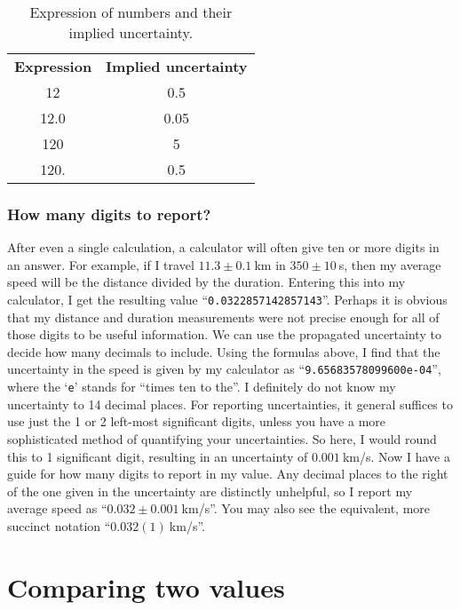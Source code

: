 \begin{table}
	\begin{center}
		\begin{tabular}{cc}
			\textbf{Expression} & \textbf{Implied uncertainty} \\
			12 & 0.5 \\
			12.0 & 0.05 \\
			120 & 5 \\
			120. & 0.5
		\end{tabular}
		\caption{Expression of numbers and their implied uncertainty.}\label{unc:tab:implied}
	\end{center}
\end{table}

\subsubsection{How many digits to report?}

After even a single calculation, a calculator will often give ten or more digits in an answer.
For example, if I travel $11.3 \pm 0.1\:$km in $350 \pm 10\:$s, then my average speed will be the distance divided by the duration. Entering this into my calculator, I get the resulting value ``\texttt{0.0322857142857143}''.
Perhaps it is obvious that my distance and duration measurements were not precise enough for all of those digits to be useful information.
We can use the propagated uncertainty to decide how many decimals to include.
Using the formulas above, I find that the uncertainty in the speed is given by my calculator as ``\texttt{9.65683578099600e-04}'', where the `\texttt{e}' stands for ``times ten to the''.
I definitely do not know my uncertainty to 14 decimal places.
For reporting uncertainties, it general suffices to use just the 1 or 2 left-most significant digits, unless you have a more sophisticated method of quantifying your uncertainties.
So here, I would round this to 1 significant digit, resulting in an uncertainty of $0.001\:$km/s.
Now I have a guide for how many digits to report in my value.
Any decimal places to the right of the one given in the uncertainty are distinctly unhelpful, so I report my average speed as ``$0.032 \pm 0.001\:$km/s''.
You may also see the equivalent, more succinct notation ``$0.032(1)\:$km/s''.

\section{Comparing two values}\label{unc:sec:comparing}

